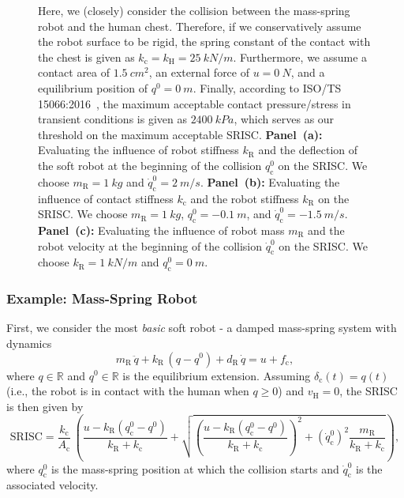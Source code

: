 \begin{figure}[ht!]
{        Here, we (closely) consider the collision between the mass-spring robot and the human chest. Therefore, if we conservatively assume the robot surface to be rigid, the spring constant of the contact with the chest is given as $k_\mathrm{c} = k_\mathrm{H} = \SI{25}{kN \per m}$. Furthermore, we assume a contact area of $\SI{1.5}{cm^2}$, an external force of $u=\SI{0}{N}$, and a equilibrium position of $q^0 = \SI{0}{m}$. Finally, according to ISO/TS 15066:2016~\citep{iso2016collaborative}, the maximum acceptable contact pressure/stress in transient conditions is given as $\SI{2400}{kPa}$, which serves as our threshold on the maximum acceptable \gls{SRISC}.
        \textbf{Panel~(a):} Evaluating the influence of robot stiffness $k_\mathrm{R}$ and the deflection of the soft robot at the beginning of the collision $q_\mathrm{c}^0$ on the \gls{SRISC}. We choose $m_\mathrm{R} = \SI{1}{kg}$ and $\dot{q}_\mathrm{c}^0 = \SI{2}{m/s}$.
        \textbf{Panel~(b):} Evaluating the influence of contact stiffness $k_\mathrm{c}$ and the robot stiffness $k_\mathrm{R}$ on the \gls{SRISC}. We choose $m_\mathrm{R} = \SI{1}{kg}$, $q_\mathrm{c}^0 = -\SI{0.1}{m}$, and $\dot{q}_\mathrm{c}^0 = -\SI{1.5}{m/s}$.
        \textbf{Panel~(c):} Evaluating the influence of robot mass $m_\mathrm{R}$ and the robot velocity at the beginning of the collision $\dot{q}_\mathrm{c}^0$ on the \gls{SRISC}. We choose $k_\mathrm{R} = \SI{1}{kN \per m}$ and $q_\mathrm{c}^0 = \SI{0}{m}$.
    }
    \label{fig:safetymetric:mass_spring_robot_characterization}
    \vspace{-0.2cm}
\end{figure}

\subsubsection{Example: Mass-Spring Robot}
First, we consider the most \emph{basic} soft robot - a damped mass-spring system with dynamics 
\begin{equation}
    m_\mathrm{R} \, \ddot{q} + k_\mathrm{R} \, (q-q^0) + d_\mathrm{R} \, \dot{q} = u + f_\mathrm{c},
\end{equation}
where $q \in \mathbb{R}$ and $q^0 \in \mathbb{R}$ is the equilibrium extension. 
Assuming $\delta_\mathrm{c}(t) = q(t)$ (i.e., the robot is in contact with the human when $q \geq 0$) and $v_\mathrm{H} = 0$, the \gls{SRISC} is then given by
\begin{equation}
     \mathrm{SRISC} = \frac{k_\mathrm{c}}{A_\mathrm{c}} \, \left (\frac{u - k_\mathrm{R} (q_{\mathrm{c}}^0 - q^0)}{k_\mathrm{R} + k_\mathrm{c}} + \sqrt{\left ( \frac{u - k_\mathrm{R} (q_{\mathrm{c}}^0 - q^0)}{k_\mathrm{R} + k_\mathrm{c}} \right )^2 + \left (\dot{q}_\mathrm{c}^0 \right )^2 \frac{m_\mathrm{R}}{k_\mathrm{R} + k_\mathrm{c}} } \right ),
\end{equation}
where $q_{\mathrm{c}}^0$ is the mass-spring position at which the collision starts and $\dot{q}_\mathrm{c}^0$ is the associated velocity.

